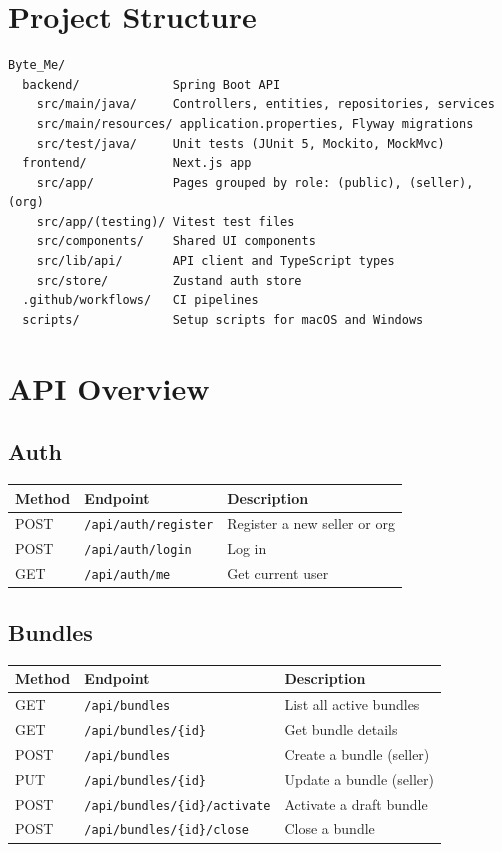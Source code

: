 \documentclass[a4paper,11pt]{article}
\begin{document}
\section{Project Structure}

\begin{lstlisting}
Byte_Me/
  backend/             Spring Boot API
    src/main/java/     Controllers, entities, repositories, services
    src/main/resources/ application.properties, Flyway migrations
    src/test/java/     Unit tests (JUnit 5, Mockito, MockMvc)
  frontend/            Next.js app
    src/app/           Pages grouped by role: (public), (seller), (org)
    src/app/(testing)/ Vitest test files
    src/components/    Shared UI components
    src/lib/api/       API client and TypeScript types
    src/store/         Zustand auth store
  .github/workflows/   CI pipelines
  scripts/             Setup scripts for macOS and Windows
\end{lstlisting}

\section{API Overview}

\subsection{Auth}

\begin{tabular}{l l l}
\toprule
Method & Endpoint & Description \\
\midrule
POST & \texttt{/api/auth/register} & Register a new seller or org \\
POST & \texttt{/api/auth/login} & Log in \\
GET & \texttt{/api/auth/me} & Get current user \\
\bottomrule
\end{tabular}

\subsection{Bundles}

\begin{tabular}{l l l}
\toprule
Method & Endpoint & Description \\
\midrule
GET & \texttt{/api/bundles} & List all active bundles \\
GET & \texttt{/api/bundles/\{id\}} & Get bundle details \\
POST & \texttt{/api/bundles} & Create a bundle (seller) \\
PUT & \texttt{/api/bundles/\{id\}} & Update a bundle (seller) \\
POST & \texttt{/api/bundles/\{id\}/activate} & Activate a draft bundle \\
POST & \texttt{/api/bundles/\{id\}/close} & Close a bundle \\
\bottomrule
\end{tabular}
\end{document}
